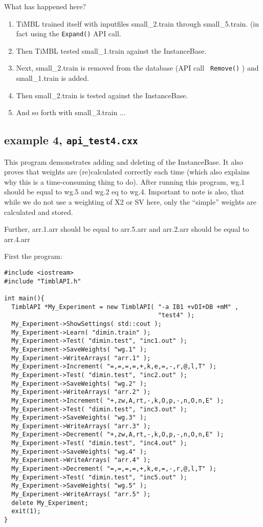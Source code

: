 \documentclass{report}
\begin{document}
What has happened here?

\begin{enumerate}
\item TiMBL trained itself with inputfiles small\_2.train through
small\_5.train. (in fact using the {\tt Expand()} API call.
\item Then TiMBL tested small\_1.train against the InstanceBase.
\item Next, small\_2.train is removed from the database (API call {\tt
Remove()} ) and small\_1.train is added.
\item Then small\_2.train is tested against the InstanceBase.
\item And so forth with small\_3.train $\ldots$
\end{enumerate}
\clearpage

\subsection{example 4, {\tt api\_test4.cxx}}

This program demonstrates adding and deleting of the InstanceBase.  It
also proves that weights are (re)calculated correctly each time (which
also explains why this is a time-consuming thing to do). After running
this program, wg.1 should be equal to wg.5 and wg.2 eq to
wg.4. Important to note is also, that while we do not use a weighting
of X2 or SV here, only the ``simple'' weights are calculated and
stored.

Further, arr.1.arr should be equal to arr.5.arr and arr.2.arr should be equal
to arr.4.arr

First the program: 

\begin{footnotesize}
\begin{verbatim}
#include <iostream>
#include "TimblAPI.h"

int main(){
  TimblAPI *My_Experiment = new TimblAPI( "-a IB1 +vDI+DB +mM" , 
                                          "test4" );
  My_Experiment->ShowSettings( std::cout );
  My_Experiment->Learn( "dimin.train" );  
  My_Experiment->Test( "dimin.test", "inc1.out" );
  My_Experiment->SaveWeights( "wg.1" );  
  My_Experiment->WriteArrays( "arr.1" );  
  My_Experiment->Increment( "=,=,=,=,+,k,e,=,-,r,@,l,T" );  
  My_Experiment->Test( "dimin.test", "inc2.out" );
  My_Experiment->SaveWeights( "wg.2" );  
  My_Experiment->WriteArrays( "arr.2" );  
  My_Experiment->Increment( "+,zw,A,rt,-,k,O,p,-,n,O,n,E" );  
  My_Experiment->Test( "dimin.test", "inc3.out" );
  My_Experiment->SaveWeights( "wg.3" );  
  My_Experiment->WriteArrays( "arr.3" );  
  My_Experiment->Decrement( "+,zw,A,rt,-,k,O,p,-,n,O,n,E" );  
  My_Experiment->Test( "dimin.test", "inc4.out" );
  My_Experiment->SaveWeights( "wg.4" );  
  My_Experiment->WriteArrays( "arr.4" );  
  My_Experiment->Decrement( "=,=,=,=,+,k,e,=,-,r,@,l,T" );  
  My_Experiment->Test( "dimin.test", "inc5.out" );
  My_Experiment->SaveWeights( "wg.5" );  
  My_Experiment->WriteArrays( "arr.5" );  
  delete My_Experiment;
  exit(1);
}
\end{verbatim}
\end{footnotesize}
\end{document}
